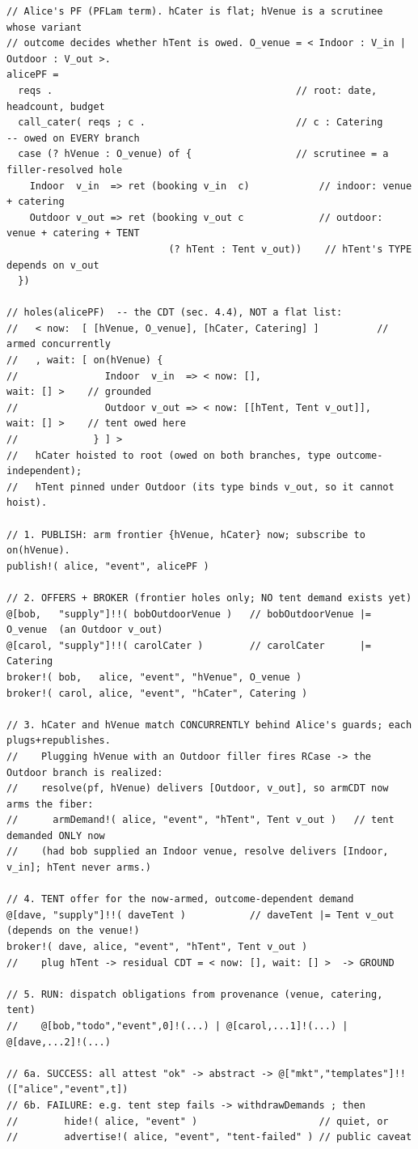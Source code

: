 \documentclass[11pt]{article}
\begin{document}
\begin{lstlisting}[language=rho]
// Alice's PF (PFLam term). hCater is flat; hVenue is a scrutinee whose variant
// outcome decides whether hTent is owed. O_venue = < Indoor : V_in | Outdoor : V_out >.
alicePF =
  reqs .                                          // root: date, headcount, budget
  call_cater( reqs ; c .                          // c : Catering        -- owed on EVERY branch
  case (? hVenue : O_venue) of {                  // scrutinee = a filler-resolved hole
    Indoor  v_in  => ret (booking v_in  c)            // indoor: venue + catering
    Outdoor v_out => ret (booking v_out c             // outdoor: venue + catering + TENT
                            (? hTent : Tent v_out))    // hTent's TYPE depends on v_out
  })

// holes(alicePF)  -- the CDT (sec. 4.4), NOT a flat list:
//   < now:  [ [hVenue, O_venue], [hCater, Catering] ]          // armed concurrently
//   , wait: [ on(hVenue) {
//               Indoor  v_in  => < now: [],                      wait: [] >    // grounded
//               Outdoor v_out => < now: [[hTent, Tent v_out]],   wait: [] >    // tent owed here
//             } ] >
//   hCater hoisted to root (owed on both branches, type outcome-independent);
//   hTent pinned under Outdoor (its type binds v_out, so it cannot hoist).

// 1. PUBLISH: arm frontier {hVenue, hCater} now; subscribe to on(hVenue).
publish!( alice, "event", alicePF )

// 2. OFFERS + BROKER (frontier holes only; NO tent demand exists yet)
@[bob,   "supply"]!!( bobOutdoorVenue )   // bobOutdoorVenue |= O_venue  (an Outdoor v_out)
@[carol, "supply"]!!( carolCater )        // carolCater      |= Catering
broker!( bob,   alice, "event", "hVenue", O_venue )
broker!( carol, alice, "event", "hCater", Catering )

// 3. hCater and hVenue match CONCURRENTLY behind Alice's guards; each plugs+republishes.
//    Plugging hVenue with an Outdoor filler fires RCase -> the Outdoor branch is realized:
//    resolve(pf, hVenue) delivers [Outdoor, v_out], so armCDT now arms the fiber:
//      armDemand!( alice, "event", "hTent", Tent v_out )   // tent demanded ONLY now
//    (had bob supplied an Indoor venue, resolve delivers [Indoor, v_in]; hTent never arms.)

// 4. TENT offer for the now-armed, outcome-dependent demand
@[dave, "supply"]!!( daveTent )           // daveTent |= Tent v_out   (depends on the venue!)
broker!( dave, alice, "event", "hTent", Tent v_out )
//    plug hTent -> residual CDT = < now: [], wait: [] >  -> GROUND

// 5. RUN: dispatch obligations from provenance (venue, catering, tent)
//    @[bob,"todo","event",0]!(...) | @[carol,...1]!(...) | @[dave,...2]!(...)

// 6a. SUCCESS: all attest "ok" -> abstract -> @["mkt","templates"]!!(["alice","event",t])
// 6b. FAILURE: e.g. tent step fails -> withdrawDemands ; then
//        hide!( alice, "event" )                     // quiet, or
//        advertise!( alice, "event", "tent-failed" ) // public caveat
\end{lstlisting}
\end{document}
